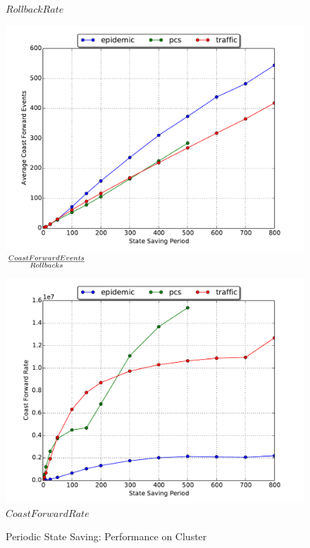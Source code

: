 \documentclass[11pt]{book}
\begin{document}
\begin{figure}
\begin{minipage}{.5\textwidth}
\begin{center}
      $Rollback Rate$ \\
    \end{center}
  \end{minipage}
  \begin{minipage}{.5\textwidth}
    \begin{center}
    \includegraphics[width=\textwidth,keepaspectratio,quiet]{figs/state_saving/beowulf/average_cf.pdf} \\
    ${Coast Forward Events \over Rollbacks}$
    \end{center}
  \end{minipage}%
  \hfill
  \begin{minipage}{.5\textwidth}
    \begin{center}
    \includegraphics[width=\textwidth,keepaspectratio,quiet]{figs/state_saving/beowulf/cf_rate.pdf} \\
    $Coast Forward Rate$
    \end{center}
  \end{minipage}
  \caption{Periodic State Saving: Performance on Cluster}\label{ssp_analysis_cluster}
\end{figure}
\end{document}
